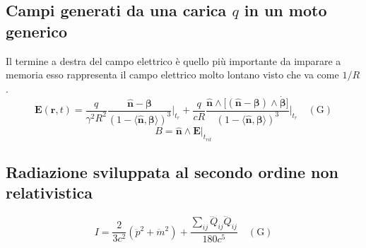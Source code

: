 \documentclass[11pt,a4paper]{report}
\newcommand{\vettore}[1]{\mathbf{#1}}
\newcommand{\pscal}[2]{\langle #1,#2\rangle}
\newcommand{\pvet}[2]{#1\wedge #2}
\begin{document}
		\subsection{Campi generati da una carica $q$ in un moto generico}
			Il termine a destra del campo elettrico è quello più importante da imparare a memoria esso rappresenta il campo elettrico molto lontano visto che va come $1/R$.
			\begin{equation}
				\vettore E(\vettore r,t)=\frac q{\gamma^2R^2}\frac{\hat{\vettore n}-\vettore \beta}{(1-\pscal{\hat{\vettore n}}{\vettore \beta})^3}\bigg|_{t_r}+
				\frac{q}{cR}
				\frac{\pvet{\hat{\vettore n}}{\big[\pvet{(\hat{\vettore n}-\vettore \beta)}{\dot{\vettore \beta}}\big]}}{(1-\pscal{\hat{\vettore n}}{\vettore \beta})^3}\bigg|_{t_r}\quad(\textrm {G})
				\label{eq:Eirr}
			\end{equation}
			\[
				B=\pvet{\hat{\vettore n}}{\vettore E}|_{t_{rit}}
			\]
		\subsection{Radiazione sviluppata al secondo ordine non relativistica}
			\begin{equation}
				I=\frac{2}{3c^2}(\ddot p^2+\ddot m^2)+\frac{\sum_{ij}\dddot Q_{ij}\dddot Q_{ij}}{180c^5}\quad(\textrm {G})
			\end{equation}
\end{document}
